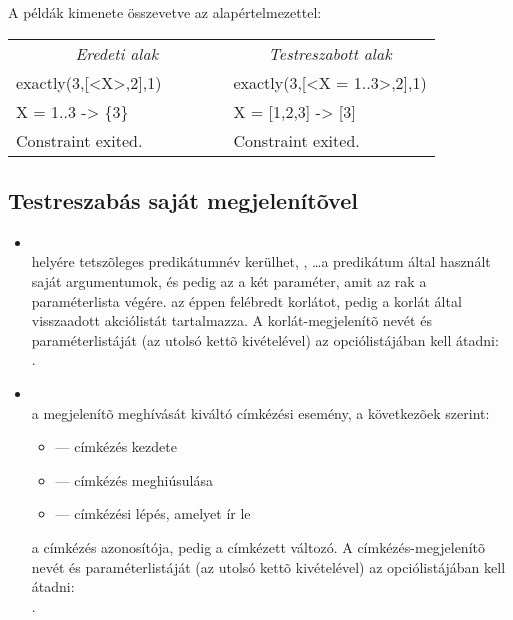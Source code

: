 A példák kimenete összevetve az alapértelmezettel:

\begin{center}\tt\begin{tabular}{l|l}
\multicolumn{1}{c}{\rm \em Eredeti alak} &
\multicolumn{1}{c}{\rm \em Testreszabott alak} \\

exactly(3,[<X>,2],1)~~~~~~~ & exactly(3,[<X = 1..3>,2],1) \\
    X = 1..3 -> \{3\}       &     X = [1,2,3] -> [3]      \\
    Constraint exited.      &     Constraint exited. \\
\end{tabular}\end{center}

\subsection{Testreszabás saját megjelenítõvel}

\begin{itemize}
\item {}\\
 helyére tetszõleges predikátumnév kerülhet, ,
 \ldots a predikátum által használt saját argumentumok, 
és  pedig az a két paraméter, amit az  rak a paraméterlista
végére.  az éppen felébredt korlátot,  pedig a korlát
által visszaadott akciólistát tartalmazza. A korlát-megjelenítõ nevét és paraméterlistáját
(az utolsó kettõ kivételével) az  opciólistájában kell átadni:\\
.

\item {}\\
 a megjelenítõ meghívását kiváltó címkézési esemény, a következõek szerint:
\begin{itemize}
\item {} --- címkézés kezdete
\item {} --- címkézés meghiúsulása
\item {} --- címkézési lépés, amelyet  ír le
\end{itemize}
 a címkézés azonosítója,  pedig a címkézett változó. A
címkézés-megjelenítõ nevét és paraméterlistáját (az utolsó kettõ kivételével) az
 opciólistájában kell átadni:\\
.
\end{itemize}


